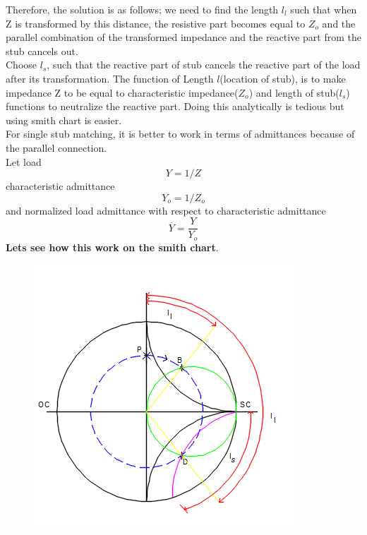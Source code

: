\begin{enumerate}[(i)]
Therefore, the solution is as follows; we need to find the length $ l_l$  such that when Z is transformed by this distance, the resistive part becomes equal to $Z_o$ and the parallel combination of the transformed impedance and the reactive part from the stub cancels out.\\

Choose $l_s$, such that the reactive part of stub cancels the reactive part of the load after its transformation. The function of Length $l$(location of stub), is to make impedance Z to be equal to characteristic impedance($Z_o$) and length of stub($l_s$) functions to neutralize the reactive part. Doing this analytically  is tedious but using smith chart is easier.\\

For single stub matching, it is better to work in terms of admittances because of the parallel connection.\\
Let load 
\begin{equation}
Y = 1/Z
\end{equation}
characteristic admittance 
\begin{equation} Y_o = 1/Z_o\end{equation} 
and normalized load admittance with respect to characteristic admittance 
\begin{equation} 
\overline{Y}=\frac{Y}{Y_o} 
\end{equation}
\textbf{Lets see how this work on the smith chart}. %
\begin{figure}[h]
\centering
\includegraphics[width=1\linewidth]{./graphics/qwtch}

\end{figure}
\end{enumerate}
